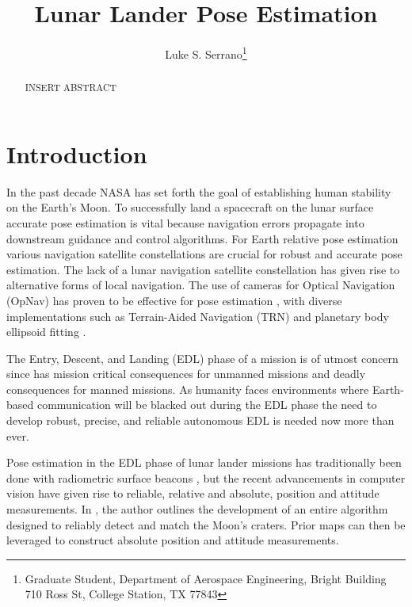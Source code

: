 \documentclass[conf]{new-aiaa}
\title{Lunar Lander Pose Estimation}
\author{Luke S. Serrano\footnote{Graduate Student, Department of Aerospace Engineering, Bright Building 710 Ross St, College Station, TX 77843}}
\affil{Texas A\&M University Department of Aerospace Engineering, College Station, TX 77843 }
\begin{document}
\maketitle

\begin{abstract}
INSERT ABSTRACT
\end{abstract}

\section{Introduction}
In the past decade NASA has set forth the goal of establishing human stability on the Earth's Moon. To successfully land a spacecraft on the lunar surface accurate pose estimation is vital because navigation errors propagate into downstream guidance and control algorithms. For Earth relative pose estimation various navigation satellite constellations are crucial for robust and accurate pose estimation. The lack of a lunar navigation satellite constellation has given rise to alternative forms of local navigation. The use of cameras for Optical Navigation (OpNav) has proven to be effective for pose estimation \cite{holt2018orion}, with diverse implementations such as Terrain-Aided Navigation (TRN) and planetary body ellipsoid fitting \cite{christian2021tutorial}.

The Entry, Descent, and Landing (EDL) phase of a mission is of utmost concern since has mission critical consequences for unmanned missions and deadly consequences for manned missions. As humanity faces environments where Earth-based communication will be blacked out during the EDL phase the need to develop robust, precise, and reliable autonomous EDL is needed now more than ever.

Pose estimation in the EDL phase of lunar lander missions has traditionally been done with radiometric surface beacons \cite{christensen2011terrain}, but the recent advancements in computer vision have given rise to reliable, relative and absolute, position and attitude measurements. In \cite{maass2020crater}, the author outlines the development of an entire algorithm designed to reliably detect and match the Moon's craters. Prior maps can then be leveraged to construct absolute position and attitude measurements.
\end{document}

